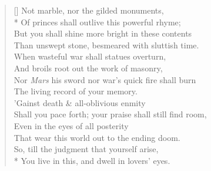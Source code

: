 \documentclass[MAIN]{subfiles}
\begin{document}
\settowidth{\versewidth}{\vin Shall you pace forth; your praise shall still find room,}
\begin{verse}[\versewidth]
Not marble, nor the gilded monuments,\\*
\vin Of princes shall outlive this powerful rhyme;\\
But you shall shine more bright in these contents\\
\vin Than unswept stone, besmeared with sluttish time.\\
When wasteful war shall statues overturn,\\
\vin And broils root out the work of masonry,\\
Nor \emph{Mars} his sword nor war's quick fire shall burn\\
\vin The living record of your memory.\\
'Gainst death \& all-oblivious enmity\\
\vin Shall you pace forth; your praise shall still find room,\\
Even in the eyes of all posterity\\
\vin That wear this world out to the ending doom.\\
So, till the judgment that yourself arise,\\*
You live in this, and dwell in lovers' eyes.
\end{verse}
\end{document}
